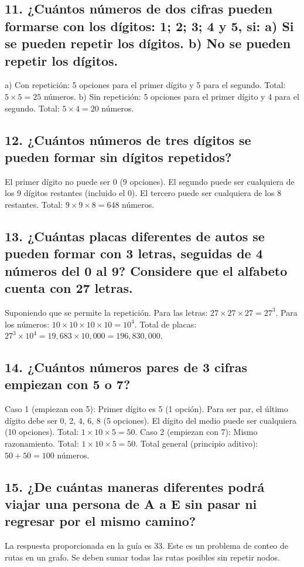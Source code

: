 \documentclass[11pt]{article}
\begin{document}
    \subsection*{11. ¿Cuántos números de dos cifras pueden formarse con los dígitos: 1; 2; 3; 4 y 5, si: a) Si se pueden repetir los dígitos. b) No se pueden repetir los dígitos.}
    a) Con repetición: 5 opciones para el primer dígito y 5 para el segundo. Total: $5 \times 5 = 25$ números.
    b) Sin repetición: 5 opciones para el primer dígito y 4 para el segundo. Total: $5 \times 4 = 20$ números.

    \subsection*{12. ¿Cuántos números de tres dígitos se pueden formar sin dígitos repetidos?}
    El primer dígito no puede ser 0 (9 opciones). El segundo puede ser cualquiera de los 9 dígitos restantes (incluido el 0). El tercero puede ser cualquiera de los 8 restantes. Total: $9 \times 9 \times 8 = 648$ números.

    \subsection*{13. ¿Cuántas placas diferentes de autos se pueden formar con 3 letras, seguidas de 4 números del 0 al 9? Considere que el alfabeto cuenta con 27 letras.}
    Suponiendo que se permite la repetición. Para las letras: $27 \times 27 \times 27 = 27^3$. Para los números: $10 \times 10 \times 10 \times 10 = 10^4$.
    Total de placas: $27^3 \times 10^4 = 19,683 \times 10,000 = 196,830,000$.

    \subsection*{14. ¿Cuántos números pares de 3 cifras empiezan con 5 o 7?}
    Caso 1 (empiezan con 5): Primer dígito es 5 (1 opción). Para ser par, el último dígito debe ser 0, 2, 4, 6, 8 (5 opciones). El dígito del medio puede ser cualquiera (10 opciones). Total: $1 \times 10 \times 5 = 50$.
    Caso 2 (empiezan con 7): Mismo razonamiento. Total: $1 \times 10 \times 5 = 50$.
    Total general (principio aditivo): $50 + 50 = 100$ números.

    \subsection*{15. ¿De cuántas maneras diferentes podrá viajar una persona de A a E sin pasar ni regresar por el mismo camino?}
    La respuesta proporcionada en la guía es 33. Este es un problema de conteo de rutas en un grafo. Se deben sumar todas las rutas posibles sin repetir nodos.
\end{document}
